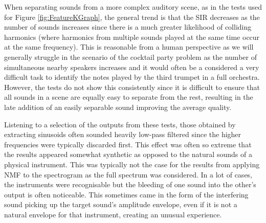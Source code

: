 \documentclass[12pt,a4paper,twoside,openright]{report}
\begin{document}


When separating sounds from a more complex auditory scene, as in the tests used for Figure \ref{fig:FeatureKGraph}, the general trend is that the SIR decreases as the number of sounds increases since there is a much greater likelihood of colliding harmonics (where harmonics from multiple sounds played at the same time occur at the same frequency). This is reasonable from a human perspective as we will generally struggle in the scenario of the cocktail party problem as the number of simultaneous nearby speakers increases and it would often be a considered a very difficult task to identify the notes played by the third trumpet in a full orchestra. However, the tests do not show this consistently since it is difficult to ensure that all sounds in a scene are equally easy to separate from the rest, resulting in the late addition of an easily separable sound improving the average quality.

Listening to a selection of the outputs from these tests, those obtained by extracting sinusoids often sounded heavily low-pass filtered since the higher frequencies were typically discarded first. This effect was often so extreme that the results appeared somewhat synthetic as opposed to the natural sounds of a physical instrument. This was typically not the case for the results from applying NMF to the spectrogram as the full spectrum was considered. In a lot of cases, the instruments were recognisable but the bleeding of one sound into the other's output is often noticeable. This sometimes came in the form of the interfering sound picking up the target sound's amplitude envelope, even if it is not a natural envelope for that instrument, creating an unusual experience.
\end{document}
